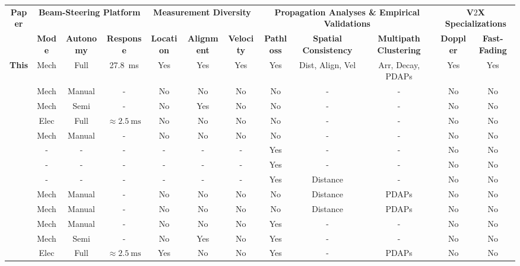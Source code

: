\documentclass[12pt, draftcls, onecolumn]{IEEEtran}
\begin{document}
\begin{table}
    \centering
    \scriptsize
    \begin{tabular}{|*{12}{c|}}
    \hline
    \multirow{2}{*}{{\bf{Paper}}} &
	\multicolumn{3}{c|}{\bf{Beam-Steering Platform}} &
    \multicolumn{3}{c|}{\bf{Measurement Diversity}} &
    \multicolumn{3}{c|}{\bf{Propagation Analyses \& Empirical Validations}} &
	\multicolumn{2}{c|}{\bf{V$2$X Specializations}}\\ &
    \bf{Mode} &
	\bf{Autonomy} &
   	\bf{Response} &
	\bf{Location} & 
    \bf{Alignment} &
    \bf{Velocity} &
    \bf{Pathloss} &
    \bf{Spatial Consistency} &
	\bf{Multipath Clustering} &
	\bf{Doppler} & 
    \bf{Fast-Fading}\\
    \hline
	\bf{This} & Mech & Full & \SI{27.8}{\milli\second} & Yes & Yes & Yes & Yes & Dist, Align, Vel  & Arr, Decay, PDAPs & Yes & Yes\\
	\hline
   ~\cite{Purdue} & Mech & Manual & - & No & No & No & No & - & - & No & No\\
    \hline
   ~\cite{Foliage} & Mech & Semi & - & No & Yes & No & No & - & - & No & No\\
    \hline
   ~\cite{AgileLink} & Elec & Full & ${\approx}\SI{2.5}{\milli\second}$ & No & No & No & No & - & - & No & No\\
    \hline
   ~\cite{Harvard} & Mech & Manual & - & No & No & No & No & - & - & No & No\\
    \hline
   ~\cite{Qualcomm3GPP} & - & - & - & - & - & - & Yes & - & - & No & No\\
    \hline
   ~\cite{MacCartneyModelsOverview} & - & - & - & - & - & - & Yes & - & - & No & No\\
    \hline
   ~\cite{MacCartneyRural} & - & - & - & - & - & - & Yes & Distance & - & No & No\\
    \hline
   ~\cite{SpatialConsistencyOriginal} & Mech & Manual & - & No & No & No & No & Distance & PDAPs & No & No\\
    \hline
   ~\cite{SpatialDynamics} & Mech & Manual & - & No & No & No & No & Distance & PDAPs & No & No\\
    \hline
   ~\cite{SuburbanGeometryJournal} & Mech & Manual & - & No & No & No & Yes & - & - & No & No\\
    \hline
   ~\cite{FoliageSimulations} & Mech & Semi & - & No & Yes & No & Yes & - & - & No & No\\
    \hline
   ~\cite{Outdoor28G} & Elec & Full & ${\approx}\SI{2.5}{\milli\second}$ & Yes & No & No & Yes & - & PDAPs & No & No\\

\end{tabular}
\end{table}
\end{document}
